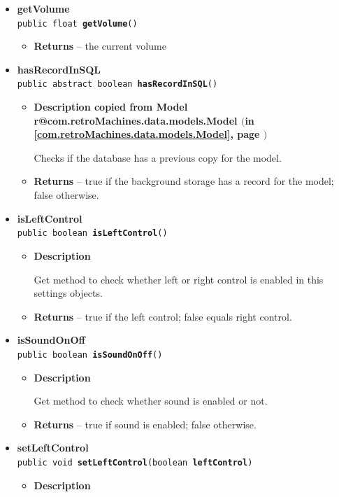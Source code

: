 \documentclass[11pt,a4paper]{report}
\makeatletter
\newcommand{\refdefined}[1]{
\expandafter\ifx\csname r@#1\endcsname\relax
\relax\else
{$($in \ref{#1}, page \pageref{#1}$)$}\fi}
\makeatother
\begin{document}
{{{{{{\begin{itemize}
{\begin{itemize}
{This method attempts to retrieve a copy of the model from the persistent background storage and saves it to this object.
}
\end{itemize}
}%
\item{ 
{\bf  getVolume}\\
\texttt{public float\ {\bf  getVolume}()
\label{com.retroMachines.data.models.Setting.getVolume()}}%
\begin{itemize}
\item{{\bf  Returns} -- 
the current volume 
}%
\end{itemize}
}%
\item{ 
{\bf  hasRecordInSQL}\\
\texttt{public abstract boolean\ {\bf  hasRecordInSQL}()
\label{com.retroMachines.data.models.Setting.hasRecordInSQL()}}%
\begin{itemize}
\item{
{\bf  Description copied from Model{\small \refdefined{com.retroMachines.data.models.Model}} }

Checks if the database has a previous copy for the model.
}
\item{{\bf  Returns} -- 
true if the background storage has a record for the model; false otherwise. 
}%
\end{itemize}
}%
\item{ 
{\bf  isLeftControl}\\
\texttt{public boolean\ {\bf  isLeftControl}()
\label{com.retroMachines.data.models.Setting.isLeftControl()}}%
\begin{itemize}
\item{
{\bf  Description}

Get method to check whether left or right control is enabled in this settings objects.
}
\item{{\bf  Returns} -- 
true if the left control; false equals right control. 
}%
\end{itemize}
}%
\item{ 
{\bf  isSoundOnOff}\\
\texttt{public boolean\ {\bf  isSoundOnOff}()
\label{com.retroMachines.data.models.Setting.isSoundOnOff()}}%
\begin{itemize}
\item{
{\bf  Description}

Get method to check whether sound is enabled or not.
}
\item{{\bf  Returns} -- 
true if sound is enabled; false otherwise. 
}%
\end{itemize}
}%
\item{ 
{\bf  setLeftControl}\\
\texttt{public void\ {\bf  setLeftControl}(\texttt{boolean} {\bf  leftControl})
\label{com.retroMachines.data.models.Setting.setLeftControl(boolean)}}%
\begin{itemize}
\item{
{\bf  Description}

}
\end{itemize}}
\end{itemize}}}}}}}
\end{document}
